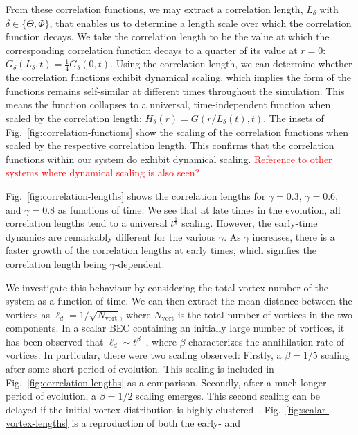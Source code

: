 From these correlation functions, we may extract a correlation length,
\(L_\delta \) with \(\delta \in \{\Theta, \Phi \} \), that enables us to
determine a length scale over which the correlation function decays.
We take the correlation length to be the value at which the corresponding
correlation function decays to a quarter of its value at
\(r=0\): \(G_\delta(L_\delta, t) = \frac{1}{4}G_\delta(0, t)\).
Using the correlation length, we can determine whether the correlation functions
exhibit dynamical scaling, which implies the form of the functions remains
self-similar at different times throughout the simulation.
This means the function collapses to a universal, time-independent function
when scaled by the correlation length: \(H_\delta(r) = G(r/L_\delta(t), t)\).
The insets of Fig.~\ref{fig:correlation-functions} show the scaling of the
correlation functions when scaled by the respective correlation length.
This confirms that the correlation functions within our system do exhibit
dynamical scaling. \textcolor{red}{Reference to other systems where dynamical
scaling is also seen?} \par
Fig.~\ref{fig:correlation-lengths} shows the correlation lengths for
\(\gamma=0.3\), \(\gamma=0.6\), and \(\gamma=0.8\) as functions of time.
We see that at late times in the evolution, all correlation lengths tend to a
universal \(t^\frac{1}{5}\) scaling.
However, the early-time dynamics are remarkably different for the various
\(\gamma \).
As \(\gamma \) increases, there is a faster growth of the correlation lengths at
early times, which signifies the correlation length being \(\gamma \)-dependent.
\par
We investigate this behaviour by considering the total vortex number of
the system as a function of time.
We can then extract the mean distance between the vortices as
\(\ell_d=1/\sqrt{N_\mathrm{vort}}\), where \(N_\mathrm{vort}\) is the total
number of vortices in the two components.
In a scalar BEC containing an initially large number of vortices, it has been
observed that \(\ell_d \sim t^\beta \)~\cite{Karl2017}, where \(\beta \)
characterizes the annihilation rate of vortices.
In particular, there were two scaling observed: Firstly, a \(\beta=1/5\) scaling
after some short period of evolution.
This scaling is included in Fig.~\ref{fig:correlation-lengths} as a comparison.
Secondly, after a much longer period of evolution, a \(\beta=1/2\) scaling
emerges.
This second scaling can be delayed if the initial vortex distribution is
highly clustered~\cite{Karl2017}.
Fig.~\ref{fig:scalar-vortex-lengths} is a reproduction of both the early- and
